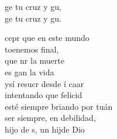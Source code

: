 \documentclass[12pt]{article}
\begin{document}
\begin{multicols*}{2}
\begin{cancion}
\begin{chorus}
	ge tu cruz y gu, \\
	ge tu cruz y gu. \\
	\end{chorus}%
	cepr que en este mundo \\
	toenemos final, \\
	que nr la muerte \\
	es gan la vida  \\
	ysí resucr desde í caar\\
	intentando que  felicid\\
	esté siempre briando por tuán\\
	 ser siempre, en debilidad, \\
	 hijo de s, un hijde Dio\\
\end{cancion}%


\end{multicols*}
\end{document}
